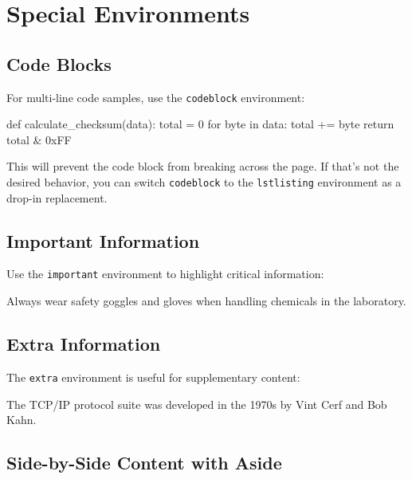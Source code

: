 \documentclass[12pt]{labmanual}
\begin{document}

\section{Special Environments}

\subsection{Code Blocks}

For multi-line code samples, use the \texttt{codeblock} environment:

\begin{codeblock}[language=python]
def calculate_checksum(data):
    total = 0
    for byte in data:
        total += byte
    return total & 0xFF
\end{codeblock}

This will prevent the code block from breaking across the page. If that's not the desired behavior, you can switch \texttt{codeblock} to the \texttt{lstlisting} environment as a drop-in replacement.

\subsection{Important Information}

Use the \texttt{important} environment to highlight critical information:

\begin{important}
Always wear safety goggles and gloves when handling chemicals in the laboratory.
\end{important}

\subsection{Extra Information}

The \texttt{extra} environment is useful for supplementary content:

\begin{extra}
The TCP/IP protocol suite was developed in the 1970s by Vint Cerf and Bob Kahn.
\end{extra}

\subsection{Side-by-Side Content with Aside}
\end{document}
